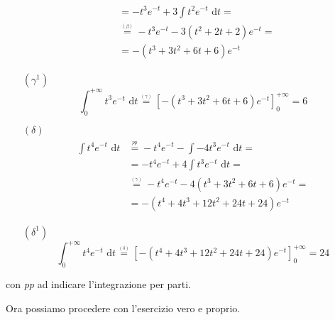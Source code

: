 \begin{nb}
\begin{enumerate}
\begin{gather*}
\begin{aligned}
&=-t^3e^{-t}+3\int t^2e^{-t}\text{ d}t=\\
&\overset{\underset{(\beta)}{}}{=}-t^3e^{-t}-3(t^2+2t+2)e^{-t}=\\
&=-(t^3+3t^2+6t+6)e^{-t}
\end{aligned}
\end{gather*}
\item [$(\gamma^1)$]
\begin{equation*}
\int_0^{+\infty} t^3e^{-t}\text{ d}t\overset{\underset{(\gamma)}{}}{=}\left[-(t^3+3t^2+6t+6)e^{-t}\right]_0^{+\infty}=6
\end{equation*}
\item [$(\delta)$]
\begin{gather*}
\begin{aligned}
\int t^4e^{-t}\text{ d}t&\overset{\underset{\textit{pp}}{}}{=}-t^4e^{-t}-\int-4t^3e^{-t}\text{ d}t=\\
&=-t^4e^{-t}+4\int t^3e^{-t}\text{ d}t=\\
&\overset{\underset{(\gamma)}{}}{=}-t^4e^{-t}-4(t^3+3t^2+6t+6)e^{-t}=\\
&=-(t^4+4t^3+12t^2+24t+24)e^{-t}
\end{aligned}
\end{gather*}
\item [$(\delta^1)$]
\begin{equation*}
\int_0^{+\infty} t^4e^{-t}\text{ d}t\overset{\underset{(\delta)}{}}{=}\left[-(t^4+4t^3+12t^2+24t+24)e^{-t}\right]_0^{+\infty}=24
\end{equation*}
$\,$
\end{enumerate}
con \textit{pp} ad indicare l'integrazione per parti.
\end{nb}
Ora possiamo procedere con l'esercizio vero e proprio.



